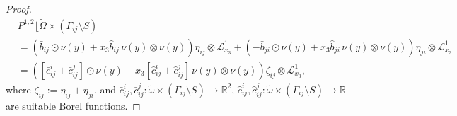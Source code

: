 \documentclass[reqno,10pt]{amsart}
\numberwithin{equation}{section}
\theoremstyle{remark}
\newcommand{\calL}{\mathcal{L}}
\newcommand{\R}{\mathbb{R}}
\newcommand{\mres}[1]{\lfloor{#1}}
\newcommand{\ext}[1]{\widetilde{#1}}
\begin{document}
\begin{proof}
\begin{align} \label{P decomposition of form on interface}
	\nonumber & P^{1,2}\mres{\ext{\Omega} \times (\Gamma_{ij} \setminus S)}
	\\ \nonumber & = \!\left( \bar{b}_{ij} \odot \nu(y) + x_3 \hat{b}_{ij}\, \nu(y) \otimes \nu(y) \right) \eta_{ij} \otimes \calL^{1}_{x_3}
	+ \!\left( -\bar{b}_{ji} \odot \nu(y) + x_3 \hat{b}_{ji}\, \nu(y) \otimes \nu(y) \right) \eta_{ji} \otimes \calL^{1}_{x_3}
	\\& = \!\left( \left[\bar{c}_{ij}^i+\bar{c}_{ij}^j\right] \odot \nu(y) + x_3 \left[\hat{c}_{ij}^i+\hat{c}_{ij}^j\right]\, \nu(y) \otimes \nu(y) \right) \zeta_{ij} \otimes \calL^{1}_{x_3},
\end{align}
where $\zeta_{ij} := \eta_{ij} + \eta_{ji}$, 
and $\bar{c}_{ij}^i, \bar{c}_{ij}^j : \ext{\omega} \times (\Gamma_{ij} \setminus S) \to \R^2$, $\hat{c}_{ij}^i, \hat{c}_{ij}^j : \ext{\omega} \times (\Gamma_{ij} \setminus S) \to \R$ are suitable Borel functions.


\end{proof}
\end{document}
